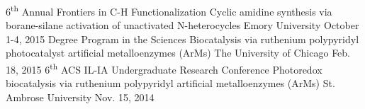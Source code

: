 
\begin{cventries}
	\cvtalk
		{6\textsuperscript{th} Annual Frontiers in C-H Functionalization} %
		{Cyclic amidine synthesis via borane-silane activation of unactivated N-heterocycles} %
		{Emory University}%
		{October 1-4, 2015} %
    {
    }
	\cvtalk
		{Degree Program in the Sciences} %
		{Biocatalysis via ruthenium polypyridyl photocatalyst artificial metalloenzymes (ArMs)} %
		{The University of Chicago}%
		{Feb. 18, 2015} %
    {
    }
	\cvtalk
		{6\textsuperscript{th} ACS IL-IA Undergraduate Research Conference} %
		{Photoredox biocatalysis via ruthenium polypyridyl artificial metalloenzymes (ArMs)} %
		{St. Ambrose University}%
		{Nov. 15, 2014} %
    {
    }
\end{cventries}
